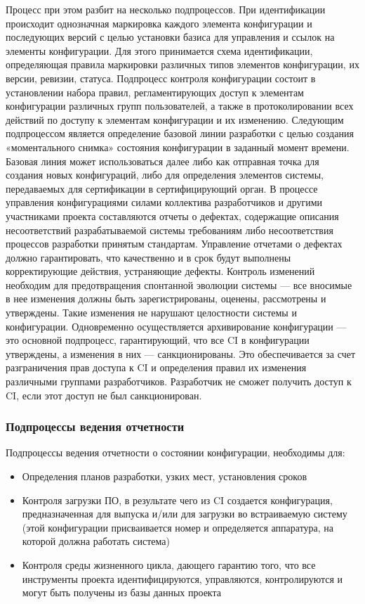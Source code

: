 \documentclass{../industrial-development}
\begin{document}
\lecturenotes
Процесс при этом разбит на несколько подпроцессов. При идентификации происходит однозначная маркировка каждого элемента конфигурации и последующих версий с целью установки базиса для управления и ссылок на элементы конфигурации. Для этого принимается схема идентификации, определяющая правила маркировки различных типов элементов конфигурации, их версии, ревизии, статуса. Подпроцесс контроля конфигурации состоит в установлении набора правил, регламентирующих доступ к элементам конфигурации различных групп пользователей, а также в протоколировании всех действий по доступу к элементам конфигурации и их изменению.
Следующим подпроцессом является определение базовой линии разработки с целью создания «моментального снимка» состояния конфигурации в заданный момент времени. Базовая линия может использоваться далее либо как отправная точка для создания новых конфигураций, либо для определения элементов системы, передаваемых для сертификации в сертифицирующий орган.
В процессе управления конфигурациями силами коллектива разработчиков и другими участниками проекта составляются отчеты о дефектах, содержащие описания несоответствий разрабатываемой системы требованиям либо несоответствия процессов разработки принятым стандартам. Управление отчетами о дефектах должно гарантировать, что качественно и в срок будут выполнены корректирующие действия, устраняющие дефекты.
Контроль изменений необходим для предотвращения спонтанной эволюции системы — все вносимые в нее изменения должны быть зарегистрированы, оценены, рассмотрены и утверждены. Такие изменения не нарушают целостности системы и конфигурации. Одновременно осуществляется архивирование конфигурации — это основной подпроцесс, гарантирующий, что все CI в конфигурации утверждены, а изменения в них — санкционированы. Это обеспечивается за счет разграничения прав доступа к CI и определения правил их изменения различными группами разработчиков. Разработчик не сможет получить доступ к CI, если этот доступ не был санкционирован.
~\cite{Standarts}

\begin{frame} \frametitle{Подпроцессы ведения отчетности}
\begin{block}{Подпроцессы ведения отчетности о состоянии конфигурации, необходимы для:}
  \begin{itemize}
\item Определения планов разработки, узких мест, установления сроков
\item Контроля загрузки ПО, в результате чего из CI создается конфигурация, предназначенная для выпуска и/или для загрузки во встраиваемую систему (этой конфигурации присваивается  номер и определяется аппаратура, на которой должна работать система)
\item Контроля среды жизненного цикла, дающего гарантию того, что все инструменты проекта идентифицируются, управляются, контролируются и могут быть получены из базы данных проекта
  \end{itemize}
	\end{block}
\end{frame}
\end{document}
